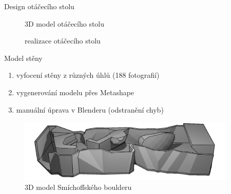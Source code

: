 \documentclass[czech]{beamer}
\begin{document}
\begin{frame}{Design otáčecího stolu}
		\begin{minipage}[t]{0.47\textwidth}
			\begin{figure}
				\centering
				\hfill
				\caption*{3D model otáčecího stolu}
			\end{figure}
		\end{minipage}%
		\hfill
		\begin{minipage}[t]{0.47\textwidth}
			\begin{figure}
				\centering
				\hfill
				\caption*{realizace otáčecího stolu}
			\end{figure}
		\end{minipage}
	\end{frame}

	\begin{frame}{Model stěny}
		\begin{enumerate}
			\item vyfocení stěny z různých úhlů (188 fotografií)
			\item vygenerování modelu přes Metashape
			\item manuální úprava v Blenderu (odstranění chyb)
		\end{enumerate}

		\vspace{0.7em}

		\begin{figure}
			\centering
			\includegraphics[height=3.0cm]{images/wall.jpg}
			\caption*{3D model Smíchoffského boulderu}
		\end{figure}
	\end{frame}
\end{document}
